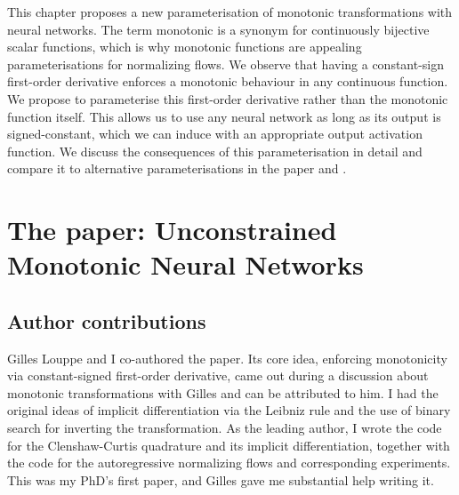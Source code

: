 This chapter proposes a new parameterisation of monotonic transformations with neural networks. The term monotonic is a synonym for continuously bijective scalar functions, which is why monotonic functions are appealing parameterisations for normalizing flows. We observe that having a constant-sign first-order derivative enforces a monotonic behaviour in any continuous function. We propose to parameterise this first-order derivative rather than the monotonic function itself. This allows us to use any neural network as long as its output is signed-constant, which we can induce with an appropriate output activation function. We discuss the consequences of this parameterisation in detail and compare it to alternative parameterisations in the paper and .

%


\section{The paper: Unconstrained Monotonic Neural Networks}
\subsection{Author contributions}
Gilles Louppe and I co-authored the paper. Its core idea, enforcing monotonicity via constant-signed first-order derivative, came out during a discussion about monotonic transformations with Gilles and can be attributed to him. I had the original ideas of implicit differentiation via the Leibniz rule and the use of binary search for inverting the transformation. As the leading author, I wrote the code for the Clenshaw-Curtis quadrature and its implicit differentiation, together with the code for the autoregressive normalizing flows and corresponding experiments. This was my PhD's first paper, and Gilles gave me substantial help writing it.

